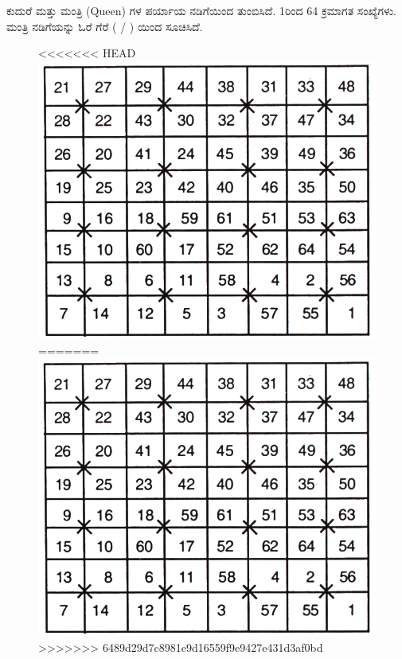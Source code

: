 ಕುದುರೆ ಮತ್ತು ಮಂತ್ರಿ (Queen) ಗಳ ಪರ್ಯಾಯ ನಡಿಗೆಯಿಂದ ತುಂಬಿಸಿದೆ. 1ರಿಂದ 64 ಕ್ರಮಾಗತ ಸಂಖ್ಯೆಗಳು. ಮಂತ್ರಿ ನಡಿಗೆಯನ್ನು ಓರೆ ಗೆರೆ ( / ) ಯಿಂದ ಸೂಚಿಸಿದೆ.
\begin{figure}[H]
<<<<<<< HEAD
\includegraphics{src/figures/chap6/fig6-23.jpg}
=======
\includegraphics[scale=0.85]{src/figures/chap6/fig6.23.jpg}
>>>>>>> 6489d29d7c8981e9d16559f9e9427e431d3af0bd
\end{figure}

